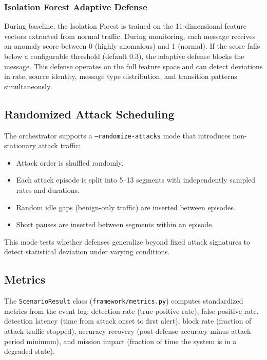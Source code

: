 \subsubsection{Isolation Forest Adaptive Defense}
During baseline, the Isolation Forest is trained on the 11-dimensional
feature vectors extracted from normal traffic.  During monitoring, each
message receives an anomaly score between 0 (highly anomalous) and 1
(normal).  If the score falls below a configurable threshold (default
0.3), the adaptive defense blocks the message.  This defense operates on
the full feature space and can detect deviations in rate, source
identity, message type distribution, and transition patterns
simultaneously.

\subsection{Randomized Attack Scheduling}

The orchestrator supports a \texttt{--randomize-attacks} mode that
introduces non-stationary attack traffic:
\begin{itemize}
    \item Attack order is shuffled randomly.
    \item Each attack episode is split into 5--13 segments with
          independently sampled rates and durations.
    \item Random idle gaps (benign-only traffic) are inserted between
          episodes.
    \item Short pauses are inserted between segments within an episode.
\end{itemize}
This mode tests whether defenses generalize beyond fixed attack
signatures to detect statistical deviation under varying conditions.

\subsection{Metrics}

The \texttt{ScenarioResult} class (\texttt{framework/metrics.py})
computes standardized metrics from the event log: detection rate (true
positive rate), false-positive rate, detection latency (time from attack
onset to first alert), block rate (fraction of attack traffic stopped),
accuracy recovery (post-defense accuracy minus attack-period minimum),
and mission impact (fraction of time the system is in a degraded state).
